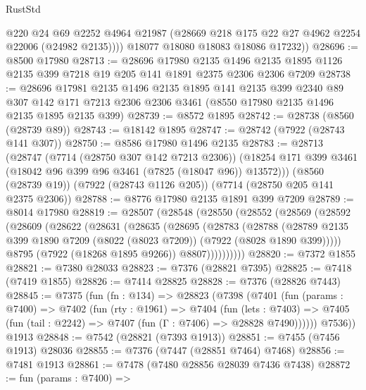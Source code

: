 \begin{lexlean}{RustStd}
\begin{coremodule}
            @220
            @24
            @69
            @2252
            @4964
            @21987
            (@28669 @218 @175 @22 @27 @4962 @2254 @22006 (@24982 @2135))))
        @18077
        @18080
        @18083
        @18086
        @17232))
@28696 := @8500 @17980
@28713 := @28696
    @17980
    @2135
    @1496
    @2135
    @1895
    @1126
    @2135
    @399
    @7218
    @19
    @205
    @141
    @1891
    @2375
    @2306
    @2306
    @7209
@28738 := @28696
    @17981
    @2135
    @1496
    @2135
    @1895
    @141
    @2135
    @399
    @2340
    @89
    @307
    @142
    @171
    @7213
    @2306
    @2306
    @3461
    (@8550 @17980 @2135 @1496 @2135 @1895 @2135 @399)
@28739 := @8572 @1895
@28742 := @28738 (@8560 (@28739 @89))
@28743 := @18142 @1895
@28747 := @28742 (@7922 (@28743 @141 @307))
@28750 := @8586 @17980 @1496 @2135
@28783 := @28713
    (@28747
      (@7714 (@28750 @307 @142 @7213 @2306))
      (@18254 @171 @399 @3461 (@18042 @96 @399 @96 @3461 (@7825 (@18047 @96)) @13572)))
    (@8560 (@28739 @19))
    (@7922 (@28743 @1126 @205))
    (@7714 (@28750 @205 @141 @2375 @2306))
@28788 := @8776 @17980 @2135 @1891 @399 @7209
@28789 := @8014 @17980
@28819 := @28507
    (@28548
      (@28550
        (@28552
          (@28569
            (@28592
              (@28609
                (@28622
                  (@28631
                    (@28635
                      (@28695
                        (@28783
                          (@28788
                            (@28789
                              @2135
                              @399
                              @1890
                              @7209
                              (@8022 (@8023 @7209))
                              (@7922 (@8028 @1890 @399)))))
                        @8795
                        (@7922 (@18268 @1895 @9266))
                        @8807))))))))))
@28820 := @7372 @1855
@28821 := @7380 @28033
@28823 := @7376 (@28821 @7395)
@28825 := @7418 (@7419 @1855)
@28826 := @7414 @28825
@28828 := @7376 (@28826 @7443)
@28845 := @7375
    (fun (fn : @134) =>
    @28823
      (@7398
        (@7401
          (fun (params : @7400) =>
          @7402
            (fun (rty : @1961) =>
            @7404
              (fun (lets : @7403) =>
              @7405 (fun (tail : @2242) => @7407 (fun (Γ : @7406) => @28828 @7490))))))
        @7536))
    @1913
@28848 := @7542 (@28821 (@7393 @1913))
@28851 := @7455 (@7456 @1913) @28036
@28855 := @7376 (@7447 (@28851 @7464) @7468)
@28856 := @7481 @1913
@28861 := @7478 (@7480 @28856 @28039 @7436 @7438)
@28872 := fun (params : @7400) =>

\end{coremodule}
\end{lexlean}
